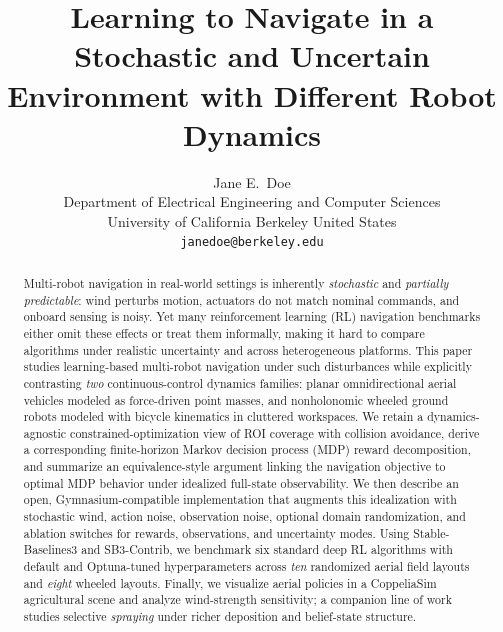 \documentclass{article}
\title{Learning to Navigate in a Stochastic and Uncertain Environment with Different Robot Dynamics}
\author{
  Jane E.~Doe\\
  Department of Electrical Engineering and Computer Sciences\\
  University of California Berkeley 
  United States\\
  \texttt{janedoe@berkeley.edu} \\
}
\begin{document}
\maketitle


\begin{abstract}
    Multi-robot navigation in real-world settings is inherently \emph{stochastic} and \emph{partially predictable}: wind perturbs motion, actuators do not match nominal commands, and onboard sensing is noisy. Yet many reinforcement learning (RL) navigation benchmarks either omit these effects or treat them informally, making it hard to compare algorithms under realistic uncertainty and across heterogeneous platforms. This paper studies learning-based multi-robot navigation under such disturbances while explicitly contrasting \emph{two} continuous-control dynamics families: planar omnidirectional aerial vehicles modeled as force-driven point masses, and nonholonomic wheeled ground robots modeled with bicycle kinematics in cluttered workspaces. We retain a dynamics-agnostic constrained-optimization view of ROI coverage with collision avoidance, derive a corresponding finite-horizon Markov decision process (MDP) reward decomposition, and summarize an equivalence-style argument linking the navigation objective to optimal MDP behavior under idealized full-state observability. We then describe an open, Gymnasium-compatible implementation that augments this idealization with stochastic wind, action noise, observation noise, optional domain randomization, and ablation switches for rewards, observations, and uncertainty modes. Using Stable-Baselines3 and SB3-Contrib, we benchmark six standard deep RL algorithms with default and Optuna-tuned hyperparameters across \emph{ten} randomized aerial field layouts and \emph{eight} wheeled layouts. Finally, we visualize aerial policies in a CoppeliaSim agricultural scene and analyze wind-strength sensitivity; a companion line of work studies selective \emph{spraying} under richer deposition and belief-state structure.
\end{abstract}


\end{document}
